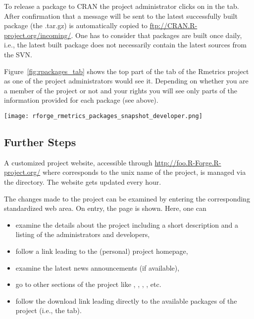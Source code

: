 To release a package to CRAN the project administrator clicks on
 in the  tab. After
confirmation that a message will be sent to 
the latest successfully built package (the .tar.gz) is automatically
copied to \url{ftp://CRAN.R-project.org/incoming/}. One has to
consider that packages are built once daily, i.e., the latest built
package does not necessarily contain the latest sources from the SVN.

Figure~\ref{fig:rpackages_tab} shows the top part of the  tab of the Rmetrics project as one of the project
administrators would see it. Depending on whether you are a member of
the project or not and your rights you will see only parts of the
information provided for each package (see above).

\begin{figure*}[th]
\centering
\texttt{[image: rforge\_rmetrics\_packages\_snapshot\_developer.png]}
\caption{ tab of the Rmetrics project}
\label{fig:rpackages_tab}
\end{figure*}

\subsection{Further Steps}

A customized project website, accessible through
\url{http://foo.R-Forge.R-project.org/} where  
corresponds to the unix name of the project, is managed via the
 directory. The website gets updated every hour. 

The changes made to the project can be examined by entering the
corresponding standardized web area. On entry, the 
page is shown. Here, one can 

\begin{itemize}
\item examine the details about the project including a short
  description and a listing of the administrators and developers,
\item follow a link leading to the (personal) project homepage,
\item examine the latest news announcements (if available),
\item go to other sections of the project like
  , ,
   , , etc.
\item follow the download link leading directly to the available
  packages of the project (i.e., the  tab).
\end{itemize}

